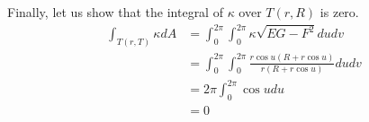 \documentclass[a4paper, 12pt]{article}
\begin{document}
\begin{Exercise}
\begin{enumerate}[label=(\roman*)]
            Finally, let us show that the integral of $\kappa$ over $T(r, R)$ is zero.
            \begin{align*}
                \int_{T(r, T)} \kappa dA
                &= \int_{0}^{2\pi}\int_{0}^{2\pi} \kappa \sqrt{EG-F^2}dudv \\
                &= \int_{0}^{2\pi}\int_{0}^{2\pi} \frac{r\cos u(R + r\cos u)}{r(R + r\cos u)} dudv \\
                &= 2\pi \int_{0}^{2\pi} \cos u du \\
                &= 0
            \end{align*}
    \end{enumerate}
\end{Exercise}
\end{document}
